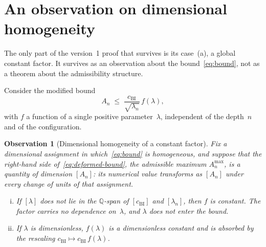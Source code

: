 \documentclass[11pt,a4paper]{article}
\newtheorem{observation}[theorem]{Observation}
\begin{document}
  \section{An observation on dimensional homogeneity}
  \label{sec:homogeneity}

    The only part of the version~1 proof that survives is its case~(a), a global constant factor.
    It survives as an observation about the bound~\eqref{eq:bound}, not as a theorem about the admissibility
    structure.

    Consider the modified bound
    \begin{equation}
      \label{eq:deformed-bound}
      A_n \;\le\; \frac{c_{\mathrm{BI}}}{\sqrt{\lambda_n}}\,f(\lambda),
    \end{equation}
    with $f$ a function of a single positive parameter~$\lambda$, independent of the depth~$n$ and of the
    configuration.

    \begin{observation}[Dimensional homogeneity of a constant factor]
      \label{obs:homogeneity}
      Fix a dimensional assignment in which~\eqref{eq:bound} is homogeneous, and suppose that the right-hand side
      of~\eqref{eq:deformed-bound}, the admissible maximum $A_n^{\max}$, is a quantity of dimension $[A_n]$: its
      numerical value transforms as $[A_n]$ under every change of units of that assignment.
      \begin{enumerate}[(i)]
        \item If $[\lambda]$ does not lie in the $\mathbb{Q}$-span of $[c_{\mathrm{BI}}]$ and $[\lambda_n]$, then
          $f$ is constant.
          The factor carries no dependence on~$\lambda$, and $\lambda$ does not enter the bound.
        \item If $\lambda$ is dimensionless, $f(\lambda)$ is a dimensionless constant and is absorbed by the
          rescaling $c_{\mathrm{BI}}\mapsto c_{\mathrm{BI}}\,f(\lambda)$.
      \end{enumerate}
    \end{observation}
\end{document}
